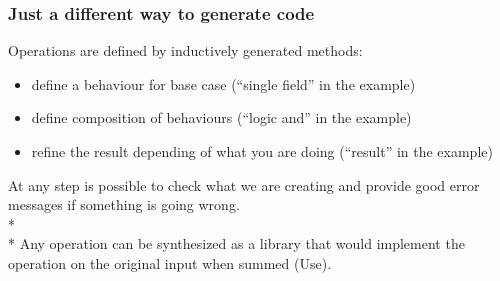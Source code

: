 \begin{frame}[fragile]
\frametitle{Just a different way to generate code}
Operations are defined by inductively generated methods:
\begin{itemize}
\item define a behaviour for base case (``single field'' in the example)
\item define composition of behaviours (``logic and'' in the example)
\item refine the result depending of what you are doing (``result'' in the example) 
\end{itemize}
At any step is possible to check what we are creating and provide good error messages if something is going wrong.\\*${}_{}$\\*
Any operation can be synthesized as a library that would implement the operation on the original input when summed (Use).

\end{frame}


%
%




